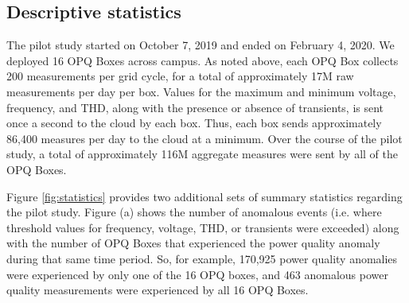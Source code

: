 \subsection{Descriptive statistics}

The pilot study started on October 7, 2019 and ended on February 4, 2020. We deployed 16 OPQ Boxes across campus. As noted above, each OPQ Box collects 200 measurements per grid cycle, for a total of approximately 17M raw measurements per day per box.  Values for the maximum and minimum voltage, frequency, and THD, along with the presence or absence of transients, is sent once a second to the cloud by each box. Thus, each box sends approximately 86,400 measures per day to the cloud at a minimum. Over the course of the pilot study, a total of approximately 116M aggregate measures were sent by all of the OPQ Boxes.

Figure \ref{fig:statistics} provides two additional sets of summary statistics regarding the pilot study.  Figure (a) shows the number of anomalous events (i.e. where threshold values for frequency, voltage, THD, or transients were exceeded) along with the number of OPQ Boxes that experienced the power quality anomaly during that same time period. So, for example, 170,925 power quality anomalies were experienced by only one of the 16 OPQ boxes, and 463 anomalous power quality measurements were experienced by all 16 OPQ Boxes.


